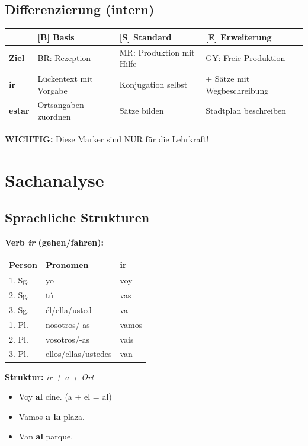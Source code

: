 \documentclass[11pt,a4paper]{article}
\newcommand{\B}{\textcolor{basis}{\textbf{[B]}}}
\newcommand{\Std}{\textcolor{standard}{\textbf{[S]}}}
\newcommand{\E}{\textcolor{erweiterung}{\textbf{[E]}}}
\begin{document}
\subsection{Differenzierung (intern)}
\begin{tabular}{|l|p{3.5cm}|p{3.5cm}|p{3.5cm}|}
\hline
& \B{} \textbf{Basis} & \Std{} \textbf{Standard} & \E{} \textbf{Erweiterung} \\
\hline
\textbf{Ziel} & BR: Rezeption & MR: Produktion mit Hilfe & GY: Freie Produktion \\
\hline
\textbf{ir} & Lückentext mit Vorgabe & Konjugation selbst & + Sätze mit Wegbeschreibung \\
\hline
\textbf{estar} & Ortsangaben zuordnen & Sätze bilden & Stadtplan beschreiben \\
\hline
\end{tabular}

\vspace{0.5em}
\textbf{WICHTIG:} Diese Marker sind NUR für die Lehrkraft!

\section{Sachanalyse}

\subsection{Sprachliche Strukturen}

\textbf{Verb \textit{ir} (gehen/fahren):}
\begin{center}
\begin{tabular}{|l|l|l|}
\hline
\textbf{Person} & \textbf{Pronomen} & \textbf{ir} \\
\hline
1. Sg. & yo & voy \\
2. Sg. & tú & vas \\
3. Sg. & él/ella/usted & va \\
1. Pl. & nosotros/-as & vamos \\
2. Pl. & vosotros/-as & vais \\
3. Pl. & ellos/ellas/ustedes & van \\
\hline
\end{tabular}
\end{center}

\textbf{Struktur:} \textit{ir + a + Ort}
\begin{itemize}
    \item Voy \textbf{al} cine. (a + el = al)
    \item Vamos \textbf{a la} plaza.
    \item Van \textbf{al} parque.
\end{itemize}
\end{document}
